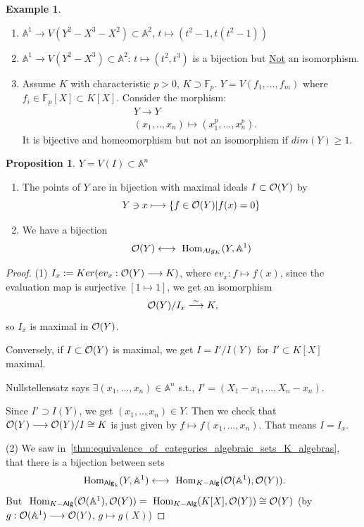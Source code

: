 \documentclass[11pt]{article}
\theoremstyle{definition}
\newtheorem{prop}[thm]{Proposition}
\newtheorem{ex}[thm]{Example}
\renewcommand{\hom}{\text{ Hom}}
\newcommand{\affn}{\mathbb A}
\newcommand{\calo}{{\cal O}}
\newcommand{\lrta}{\longrightarrow}
\newcommand{\llrta}{\longleftrightarrow}
\begin{document}
\begin{ex}\ 
\begin{enumerate}[label=(\arabic*)]
\item $\affn^1\lrta V(Y^2-X^3-X^2)\subset \affn^2$, $t\mapsto (t^2-1,t(t^2-1))$
\item $\affn^1\lrta V(Y^2-X^3)\subset \affn^2$: $t\longmapsto (t^2,t^3)$ is a bijection but \underline{Not} an isomorphism.
\item Assume $K$ with characteristic $p>0$, $K\supset \mathbb{F}_p$. $Y=V(f_1,...,f_m)$ where $f_i\in \mathbb{F}_p[X]\subset K[X]$. Consider the morphism:
$$
\begin{aligned}
&Y\lrta Y\\
& (x_1,..,x_n)\longmapsto (x_1^p,...,x_n^p).
\end{aligned}
$$
It is bijective and homeomorphism but not an isomorphism if $dim(Y)\geq 1$.
\end{enumerate}
\end{ex}
\begin{prop}
$Y=V(I)\subset \affn^n$
\begin{enumerate}[label=(\arabic*)]
\item The points of $Y$ are in bijection with maximal ideals $I\subset \calo(Y)$ by 
$$
Y\ni x\longmapsto \{f\in \calo(Y)|f(x)=0\}
$$
\item We have a bijection 
$$
\calo(Y)\llrta \hom_{Alg_K}(Y,\affn^1)
$$
\end{enumerate}
\end{prop}
\begin{proof}
(1) $I_x:=Ker(ev_x:\calo(Y)\lrta K)$, where $ev_x:f\mapsto f(x)$, since the evaluation map is surjective $[1\mapsto 1]$, we get an isomorphism 
$$
\calo(Y)/I_x\overset{\sim}{\lrta} K,
$$
so $I_x$ is maximal in $\calo(Y)$.

Conversely, if $I\subset \calo(Y)$ is maximal, we get $I=I'/I(Y)$ for $I'\subset K[X]$ maximal. 

Nullstellensatz says $\exists (x_1,...,x_n)\in\affn^n$ s.t., $I'=(X_1-x_1,...,X_n-x_n)$. 

Since $I'\supset I(Y)$, we get $(x_1,..,x_n)\in Y$. Then we check that $\calo(Y)\lrta\calo(Y)/I\cong K$ is just given by $f\mapsto f(x_1,...,x_n)$. That means $I=I_x$.

(2) We saw in~\ref{thm:equivalence_of_categories_algebraic_sets_K_algebras}, that there is a bijection between sets
$$
\hom_{\mathsf{Alg}_k}(Y,\affn^1)\llrta \hom_{K-\mathsf{Alg}}(\calo(\affn^1),\calo(Y)).
$$
But $\hom_{K-\mathsf{Alg}}(\calo(\affn^1),\calo(Y))=\hom_{K-\mathsf{Alg}}(K[X],\calo(Y))\cong \calo(Y)$ (by $g:\calo(\affn^1)\lrta \calo(Y)$, $g\mapsto g(X)$)
\end{proof}
\end{document}
